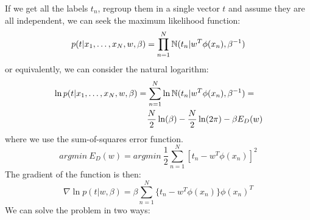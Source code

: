 If we get all the labels $t_{n}$, regroup them in a single vector $t$ and assume they are all independent, we can seek the maximum likelihood function:
\begin{equation}
    p(t|x_{1}, \dots, x_{N}, w, \beta) = \prod_{n=1}^{N}\mathbb{N}(t_{n}|w^{T}\phi(x_{n}), \beta^{-1})
\end{equation}
or equivalently, we can consider the natural logarithm:
\begin{equation}
    \begin{multlined}
    \ln p(t|x_{1}, \dots, x_{N}, w, \beta) = \sum_{n=1}^{N}\ln \N(t_{n}|w^{T}\phi(x_{n}), \beta^{-1}) = \\
    \frac{N}{2} \ln (\beta) - \frac{N}{2}\ln (2\pi) - \beta E_{D}(w)
    \end{multlined}
\end{equation}
where we use the sum-of-squares error function.
\begin{equation}
    argmin\ E_{D}(w) = argmin\ \frac{1}{2}\sum_{n=1}^{N}[t_{n} - w^{T}\phi(x_{n})]^{2}
\end{equation}
The gradient of the function is then:
\begin{equation}
    \nabla \ln p(t|w, \beta) = \beta \sum_{n = 1} ^{N} \{t_{n} - w^{T}\phi(x_{n})\} \phi(x_{n})^{T}
\end{equation}
We can solve the problem in two ways:
